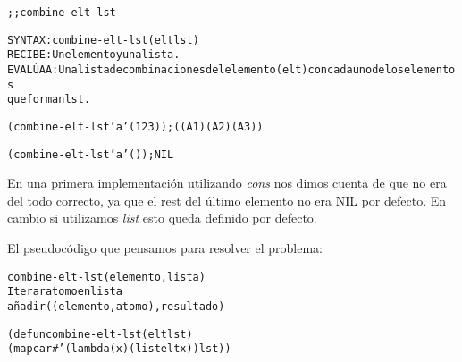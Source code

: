 
\begin{aibox}{\function}
\begin{alltt}
;; combine-elt-lst

SYNTAX: combine-elt-lst (elt lst)
RECIBE: Un elemento y una lista.
EVALÚA A: Una lista de combinaciones del elemento (elt) con cada uno de los elementos
que forman lst.
\end{alltt}
\end{aibox}

\begin{aibox}{\examples}

\begin{alltt}
(combine-elt-lst 'a '(1 2 3)); ((A 1) (A 2) (A 3))

(combine-elt-lst 'a '()); NIL
\end{alltt}

\end{aibox}

\begin{aibox}{\comments}
En una primera implementación utilizando \emph{cons} nos dimos cuenta de que no era del todo correcto, ya que el rest del último elemento no era NIL por defecto. En cambio si utilizamos \emph{list} esto queda definido por defecto.
\end{aibox}
\begin{aibox}{\pseudocode}
El pseudocódigo que pensamos para resolver el problema:

\begin{alltt}
combine-elt-lst (elemento,lista)
    Iterar atomo en lista
        añadir ((elemento,atomo),resultado)
\end{alltt}
\end{aibox}
\begin{aibox}{\code}

\begin{alltt}

(defun combine-elt-lst (elt lst)
            (mapcar #'(lambda (x) (list elt x)) lst))

\end{alltt}
\end{aibox}

